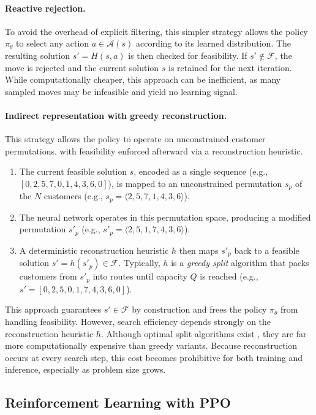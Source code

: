 \documentclass[letterpaper]{article} %
\begin{document}
\paragraph{Reactive rejection.} 
To avoid the overhead of explicit filtering, this simpler strategy allows the policy $\pi_\theta$ to select any action $a \in \mathcal{A}(s)$ according to its learned distribution. The resulting solution $s' = H(s, a)$ is then checked for feasibility. 
If $s' \notin \mathcal{F}$, the move is rejected and the current solution $s$ is retained for the next iteration. While computationally cheaper, this approach can be inefficient, as many sampled moves may be infeasible and yield no learning signal.

\paragraph{Indirect representation with greedy reconstruction.}
This strategy allows the policy to operate on unconstrained customer permutations, with feasibility enforced afterward via a reconstruction heuristic.
\begin{enumerate}
    \item The current feasible solution $s$, encoded as a single sequence (e.g., $[0,2,5,7,0,1,4,3,6,0]$), is mapped to an unconstrained permutation $s_p$ of the $N$ customers (e.g., $s_p = \langle 2,5,7,1,4,3,6 \rangle$).
    \item The neural network operates in this permutation space, producing a modified permutation $s'_p$ (e.g., $s'_p = \langle 2,5,1,7,4,3,6 \rangle$).
    \item A deterministic reconstruction heuristic $h$ then maps $s'_p$ back to a feasible solution $s' = h(s'_p) \in \mathcal{F}$.
    Typically, $h$ is a \textit{greedy split} algorithm that packs customers from $s'_p$ into routes until capacity $Q$ is reached (e.g., $s' = [0,2,5,0,1,7,4,3,6,0]$).
\end{enumerate}

This approach guarantees $s' \in \mathcal{F}$ by construction and frees the policy $\pi_\theta$ from handling feasibility. However, search efficiency depends strongly on the reconstruction heuristic $h$. Although optimal split algorithms exist \citep{vidal_technical_2016}, they are far more computationally expensive than greedy variants. Because reconstruction occurs at every search step, this cost becomes prohibitive for both training and inference, especially as problem size grows.

\subsection{Reinforcement Learning with PPO}
\label{sec:reinforcement_learning}
\end{document}
